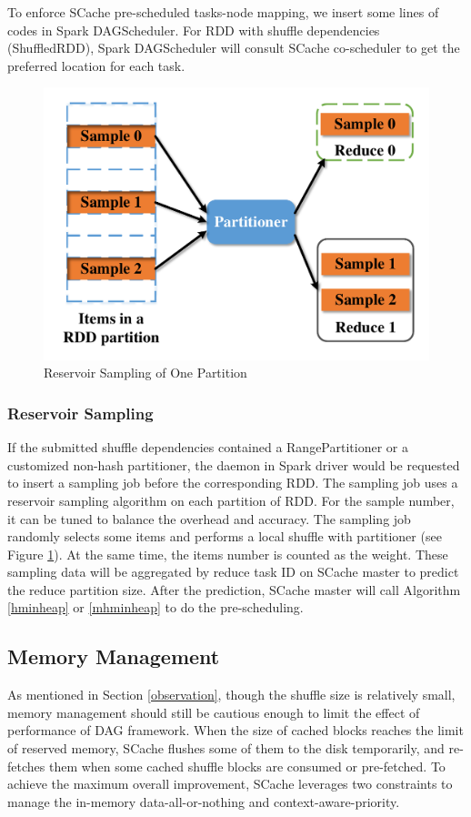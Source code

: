 To enforce SCache pre-scheduled tasks-node mapping, we insert some lines of codes in Spark DAGScheduler.
For RDD with shuffle dependencies (ShuffledRDD), Spark DAGScheduler will consult SCache co-scheduler to get the preferred location for each task.

\begin{figure}
	\centering
	\includegraphics[width=0.6\linewidth]{fig/sample}
	\caption{Reservoir Sampling of One Partition}
	\label{fig:sample}
	\vspace{-1em}
\end{figure}

\subsubsection{Reservoir Sampling}\label{sampling}
If the submitted shuffle dependencies contained a RangePartitioner or a customized non-hash partitioner, the daemon in Spark driver would be requested to insert a sampling job before the corresponding RDD. 
The sampling job uses a reservoir sampling algorithm \cite{reservoir} on each partition of RDD. 
For the sample number, it can be tuned to balance the overhead and accuracy. 
The sampling job randomly selects some items and performs a local shuffle with partitioner (see Figure \ref{fig:sample}). 
At the same time, the items number is counted as the weight. 
These sampling data will be aggregated by reduce task ID on SCache master to predict the reduce partition size. 
After the prediction, SCache master will call Algorithm \ref{hminheap} or \ref{mhminheap} to do the pre-scheduling.

\subsection{Memory Management}\label{memorymanage}
As mentioned in Section \ref{observation}, though the shuffle size is relatively small, memory management should still be cautious enough to limit the effect of performance of DAG framework.
When the size of cached blocks reaches the limit of reserved memory, SCache flushes some of them to the disk temporarily, and re-fetches them when some cached shuffle blocks are consumed or pre-fetched. 
To achieve the maximum overall improvement, SCache leverages two constraints to manage the in-memory data-all-or-nothing and context-aware-priority.

